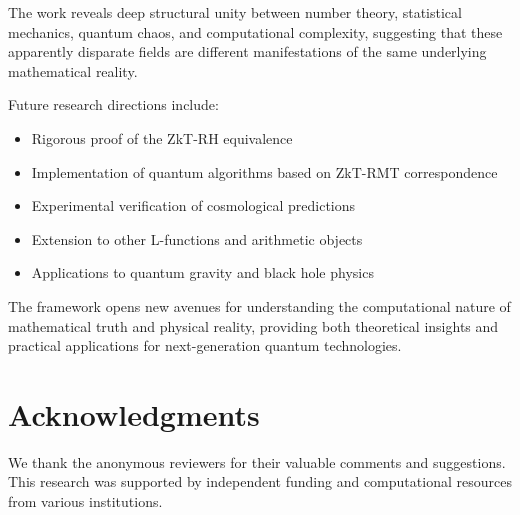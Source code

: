 \documentclass[12pt]{article}
\theoremstyle{plain}
\theoremstyle{definition}
\begin{document}
The work reveals deep structural unity between number theory, statistical mechanics, quantum chaos, and computational complexity, suggesting that these apparently disparate fields are different manifestations of the same underlying mathematical reality.

Future research directions include:

\begin{itemize}
\item Rigorous proof of the ZkT-RH equivalence
\item Implementation of quantum algorithms based on ZkT-RMT correspondence
\item Experimental verification of cosmological predictions
\item Extension to other L-functions and arithmetic objects
\item Applications to quantum gravity and black hole physics
\end{itemize}

The framework opens new avenues for understanding the computational nature of mathematical truth and physical reality, providing both theoretical insights and practical applications for next-generation quantum technologies.

\section*{Acknowledgments}

We thank the anonymous reviewers for their valuable comments and suggestions. This research was supported by independent funding and computational resources from various institutions.
\end{document}
